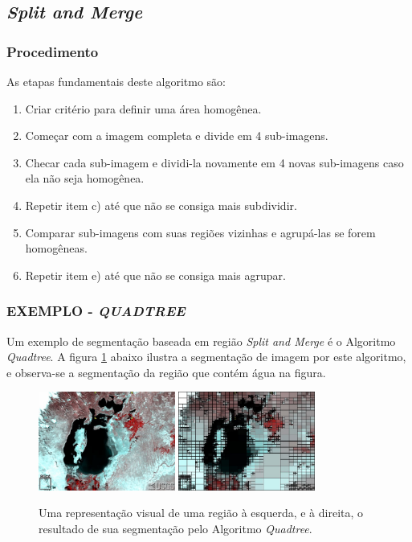 \subsection{\textit{Split and Merge}}
\subsubsection{Procedimento}
As etapas fundamentais deste algoritmo são: 
\begin{enumerate}
    \item Criar critério para definir uma área homogênea.
    \item Começar com a imagem completa e divide em 4 sub-imagens.
    \item Checar cada sub-imagem e dividi-la novamente em 4 novas sub-imagens caso ela não seja homogênea.
    \item Repetir item c) até que não se consiga mais subdividir.
    \item Comparar sub-imagens com suas regiões vizinhas e agrupá-las se forem homogêneas.
    \item Repetir item e) até que não se consiga mais agrupar.
\end{enumerate}

\subsubsection{EXEMPLO - \textit{QUADTREE}}
Um exemplo de segmentação baseada em região \textit{Split and Merge} é o Algoritmo \textit{Quadtree}. A figura \ref{fig:aral} abaixo ilustra a segmentação de imagem por este algoritmo, e observa-se a segmentação da região que contém água na figura.

\begin{figure}[!htb]
 \centering
 \def\baselinestretch{1}\small\normalsize
 \includegraphics[width=0.4\textwidth]{img/stf-aral1997.jpg}\qquad
 \includegraphics[width=0.4\textwidth]{img/stf-aral1997-quadtree.jpg} 
 \caption{\label{fig:aral}Uma representação visual de uma região à esquerda, e à direita, o resultado de sua segmentação pelo Algoritmo \textit{Quadtree}. \citep{stanford}}
\end{figure}

